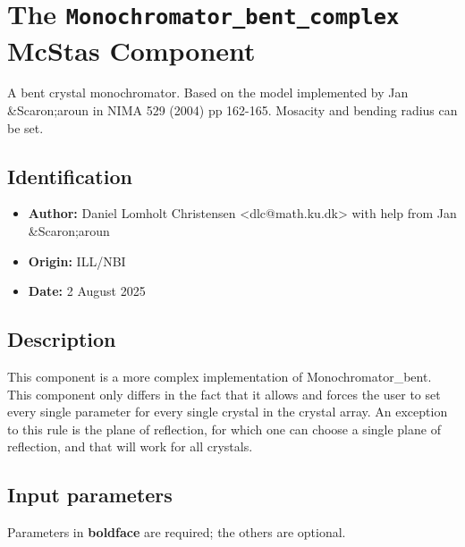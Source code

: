 \section{The \texttt{Monochromator\_bent\_complex} McStas Component}
A bent crystal monochromator. Based on the model implemented by Jan \&Scaron;aroun in NIMA 529 (2004) pp 162-165. Mosacity and bending radius can be set.

\subsection*{Identification}
\begin{itemize}
  \item \textbf{Author:} Daniel Lomholt Christensen \textless{}dlc@math.ku.dk\textgreater{} with help from Jan \&Scaron;aroun
  \item \textbf{Origin:} ILL/NBI
  \item \textbf{Date:} 2 August 2025
\end{itemize}

\subsection*{Description}
This component is a more complex implementation of Monochromator\_bent. This component only differs in the fact that it allows and forces the user to set every single parameter for every single crystal in the crystal array. An exception to this rule is the plane of reflection, for which one can choose a single plane of reflection, and that will work for all crystals.

\subsection*{Input parameters}
Parameters in \textbf{boldface} are required; the others are optional.

